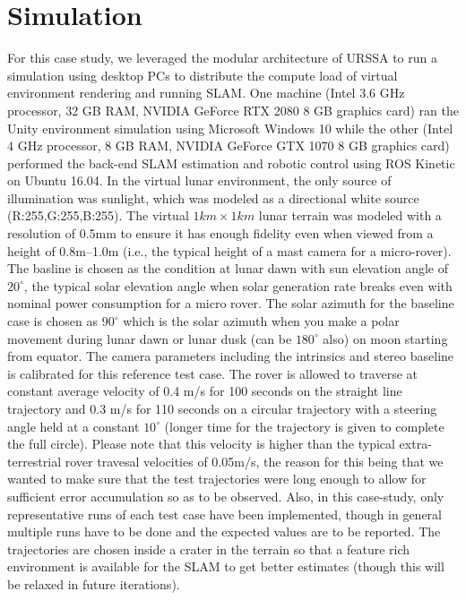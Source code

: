 \documentclass[a4paper, 10pt, conference]{ieeeconf}      %
\begin{document}
\section{Simulation }
For this case study, we leveraged the modular architecture of URSSA to run a simulation using desktop PCs to distribute the compute load of virtual environment rendering and running SLAM. One machine (Intel 3.6 GHz processor, 32 GB RAM, NVIDIA GeForce RTX 2080 8 GB graphics card) ran the Unity environment simulation using Microsoft Windows 10 while the other (Intel 4 GHz processor, 8 GB RAM, NVIDIA GeForce GTX 1070 8 GB graphics card) performed the back-end SLAM estimation and robotic control using ROS Kinetic on Ubuntu 16.04. In the virtual lunar environment, the only source of illumination was sunlight, which was modeled as a directional white source (R:255,G:255,B:255). The virtual $1km\times 1km$ lunar terrain was modeled with a resolution of 0.5mm to ensure it has enough fidelity even when viewed from a height of 0.8m--1.0m (i.e., the typical height of a mast camera for a micro-rover).
The basline is chosen as the condition at lunar dawn with sun elevation angle of $20^\circ$, the typical solar elevation angle when solar generation rate breaks even with nominal power consumption for a micro rover. The solar azimuth for the baseline case is chosen as $90^\circ$ which is the solar azimuth when you make a polar movement during lunar dawn or lunar dusk (can be $180^\circ$ also) on moon starting from equator. The camera parameters including the intrinsics and stereo baseline is calibrated for this reference test case. The rover is allowed to traverse at constant average velocity of 0.4 m/s for 100 seconds on the straight line trajectory and 0.3 m/s for 110 seconds on a circular trajectory with a steering angle held at a constant $10^\circ$ (longer time for the trajectory is given to complete the full circle). Please note that this velocity is higher than the typical extra-terrestrial rover travesal velocities of 0.05m/s, the reason for this being that we wanted to make sure that the test trajectories were long enough to allow for sufficient error accumulation so as to be observed. Also, in this case-study, only representative runs of each test case have been implemented, though in general multiple runs have to be done and the expected values are to be reported. The trajectories are chosen inside a crater in the terrain so that a feature rich environment is available for the SLAM to get better estimates (though this will be relaxed in future iterations).
\end{document}
